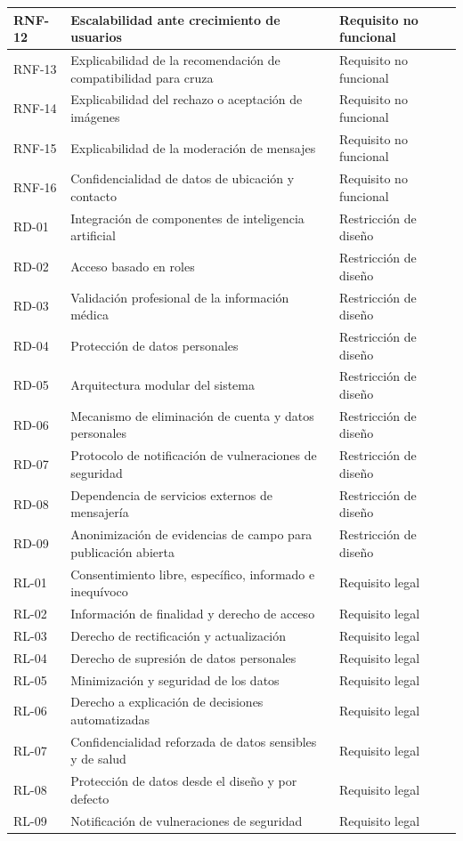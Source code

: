\documentclass[journal,onecolumn]{IEEEtran}
\begin{document}
\begin{longtable}{@{}p{2.2cm} p{7.5cm} p{3.5cm}@{}}
		\hline
		RNF-12 & Escalabilidad ante crecimiento de usuarios & Requisito no funcional \\
		\hline
		RNF-13 & Explicabilidad de la recomendación de compatibilidad para cruza & Requisito no funcional \\
		\hline
		RNF-14 & Explicabilidad del rechazo o aceptación de imágenes & Requisito no funcional \\
		\hline
		RNF-15 & Explicabilidad de la moderación de mensajes & Requisito no funcional \\
		\hline
		RNF-16 & Confidencialidad de datos de ubicación y contacto & Requisito no funcional \\
		\hline
		RD-01 & Integración de componentes de inteligencia artificial & Restricción de diseño \\
		\hline
		RD-02 & Acceso basado en roles & Restricción de diseño \\
		\hline
		RD-03 & Validación profesional de la información médica & Restricción de diseño \\
		\hline
		RD-04 & Protección de datos personales & Restricción de diseño \\
		\hline
		RD-05 & Arquitectura modular del sistema & Restricción de diseño \\
		\hline
		RD-06 & Mecanismo de eliminación de cuenta y datos personales & Restricción de diseño \\
		\hline
		RD-07 & Protocolo de notificación de vulneraciones de seguridad & Restricción de diseño \\
		\hline
		RD-08 & Dependencia de servicios externos de mensajería & Restricción de diseño \\
		\hline
		RD-09 & Anonimización de evidencias de campo para publicación abierta & Restricción de diseño \\
		\hline
		RL-01 & Consentimiento libre, específico, informado e inequívoco & Requisito legal \\
		\hline
		RL-02 & Información de finalidad y derecho de acceso & Requisito legal \\
		\hline
		RL-03 & Derecho de rectificación y actualización & Requisito legal \\
		\hline
		RL-04 & Derecho de supresión de datos personales & Requisito legal \\
		\hline
		RL-05 & Minimización y seguridad de los datos & Requisito legal \\
		\hline
		RL-06 & Derecho a explicación de decisiones automatizadas & Requisito legal \\
		\hline
		RL-07 & Confidencialidad reforzada de datos sensibles y de salud & Requisito legal \\
		\hline
		RL-08 & Protección de datos desde el diseño y por defecto & Requisito legal \\
		\hline
		RL-09 & Notificación de vulneraciones de seguridad & Requisito legal \\
	\end{longtable}
	
\end{document}

